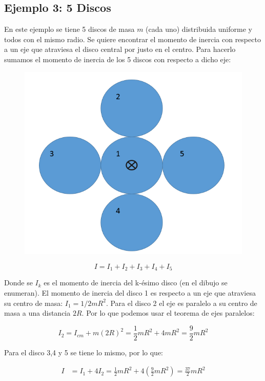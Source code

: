 \documentclass[a4paper,11pt]{article}
\begin{document}
\pagebreak

\subsection{Ejemplo 3: 5 Discos}

En este ejemplo se tiene 5 discos de masa $m$ (cada uno) distribuida uniforme y todos con el mismo radio. Se quiere encontrar el momento de inercia con respecto a un eje que atraviesa el disco central por justo en el centro. Para hacerlo sumamos el momento de inercia de los 5 discos con respecto a dicho eje:

\begin{figure}
	\includegraphics[scale=0.5]{./im/numerados}
\end{figure}

$$ I = I_1 + I_2 + I_3 + I_4 + I_5$$

Donde se $I_k$ es el momento de inercia del k-ésimo disco (en el dibujo se enumeran). El momento de inercia del disco 1 es respecto a un eje que atraviesa su centro de masa: $I_1 = 1/2 m R^2$. Para el disco 2 el eje es paralelo a su centro de masa a una distancia $2R$. Por lo que podemos usar el teorema de ejes paralelos:

$$ I_2 = I_{cm}  + m(2R)^2 = \frac{1}{2} mR^2 + 4 mR^2 = \frac{9}{2} m R^2$$

Para el disco 3,4 y 5 se tiene lo mismo, por lo que:

\begin{align*}
I &= I_1 + 4 I_2 = \frac{1}{2} mR^2 + 4 \left(\frac{9}{2} m R^2\right) = \frac{37}{2} m R^2 
\end{align*}
\end{document}
